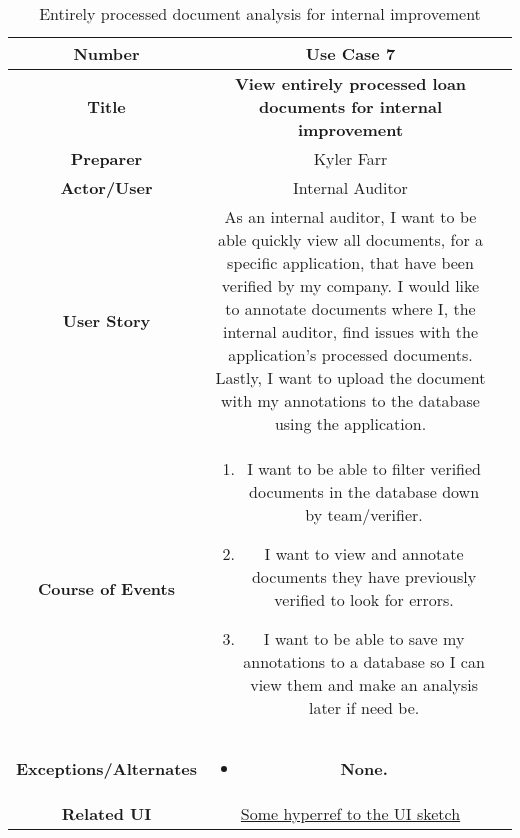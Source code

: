 \begin{table}[H]
    \centering
    \begin{tabularx}{0.75\linewidth}{||Sc|X||}
        \hline
        \hline
        \textbf{Number} & \textbf{Use Case 7} \\
        \hline
        \textbf{Title} & \textbf{View entirely processed loan documents for internal improvement} \\
        \hline
        \textbf{Preparer} & Kyler Farr \\
        \hline
        \textbf{Actor/User} & Internal Auditor \\
        \hline
        \textbf{User Story} &
        As an internal auditor, I want to be able quickly view all documents, for a specific application, that have been verified by my company. I would like to annotate documents where I, the internal auditor, find issues with the application's processed documents. Lastly, I want to upload the document with my annotations to the database using the application. \\
        \hline
        \textbf{Course of Events} &
        \begin{minipage}[l]{\linewidth}
            \begin{enumerate}[wide, labelindent=0pt]
                \item I want to be able to filter verified documents in the database down by team/verifier.
                \item I want to view and annotate documents they have previously verified to look for errors.
                \item I want to be able to save my annotations to a database so I can view them and make an analysis later if need be.
            \end{enumerate}
            \vspace{4pt}
        \end{minipage} \\
        \hline
        \textbf{Exceptions/Alternates} & 
        \begin{minipage}[l]{\linewidth}
            \vspace{2pt}
            \begin{itemize}[wide, labelindent=0pt]
                \item \textbf{None.}
            \end{itemize}
        \end{minipage} \\
        \hline
        \textbf{Related UI} & \hyperref[templatesec]{Some hyperref to the UI sketch} \\
        \hline
        \hline
    \end{tabularx}
    \caption{Entirely processed document analysis for internal improvement}
    \label{tab:use_case_internal}
\end{table}